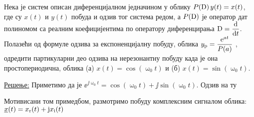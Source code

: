 \PID
Нека је систем описан диференцијалном једначином у облику
$\displaystyle
P({\rm D})\,y(t) = x(t)$, где су $x(t)$ и $y(t)$ побуда и одзив тог система редом, а 
$P({\rm D})$ је оператор дат полиномом са реалним коефицијентима по оператору диференцирања 
${\rm D} = \dfrac{{\rm d} }{{\rm d} t}$. Полазећи од формуле одзива за експоненцијалну побуду, 
облика $y_{\rm p} = \dfrac{ {\rm e}^{at} }{P(a)}$
, одредити 
партикуларни део одзива на нерезонантну побуду када је она простопериодична, облика 
(а) $x(t) = \cos(\upomega_0 t)$ и 
(б) $x(t) = \sin(\upomega_0 t)$.

\underline{\sc Решење:} Приметимо да је 
$\ee^{\jj\upomega_0 t} = \cos(\upomega_0 t) + \jj \sin(\upomega_0 t)$. Одзив на ту 

Мотивисани том примедбом, 
размотримо побуду комплексним сигналом облика: 
$\underline{x}(t) = x_{\rm r}(t) + {\rm j} x_{\rm i}(t)$ 